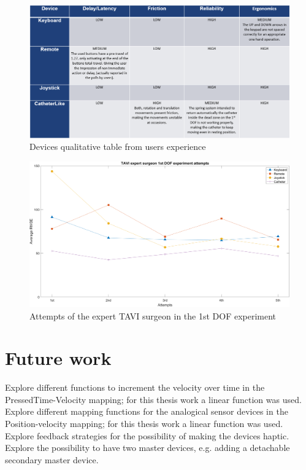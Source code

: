 \begin{figure}[ht]
   \centering
   \includegraphics[width=1.0\textwidth]{img/devcomp.PNG}
   \caption{Devices qualitative table from users experience}
   \label{img:devcomp}
\end{figure}

\begin{figure}[ht]
   \centering
   \includegraphics[width=1.0\textwidth]{img/surgat.PNG}
   \caption{Attempts of the expert TAVI surgeon in the 1st DOF experiment}
   \label{img:surgeat}
\end{figure}
\clearpage

\section{Future work} \label{futurework}
Explore different functions to increment the velocity over time in the PressedTime-Velocity mapping; for this thesis work a linear function was used.\\

Explore different mapping functions for the analogical sensor devices in the Position-velocity mapping; for this thesis work a linear function was used.\\

Explore feedback strategies for the possibility of making the devices haptic.\\

Explore the possibility to have two master devices, e.g. adding a detachable secondary master device.\\

